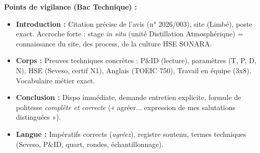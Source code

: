 \documentclass[11pt]{article}
\begin{document}
\begin{corrige}
\textbf{Points de vigilance (Bac Technique) :}
\begin{itemize}
    \item \textbf{Introduction :} Citation précise de l'avis (n° 2026/003), site (Limbé), poste exact. Accroche forte : stage \emph{in situ} (unité Distillation Atmosphérique) = connaissance du site, des process, de la culture HSE SONARA.
    \item \textbf{Corps :} Preuves techniques concrètes : P\&ID (lecture), paramètres (T, P, D, N), HSE (Seveso, certif N1), Anglais (TOEIC 750), Travail en équipe (3x8). Vocabulaire métier exact.
    \item \textbf{Conclusion :} Dispo immédiate, demande entretien explicite, formule de politesse \emph{complète et correcte} (« agréer... expression de mes salutations distinguées »).
    \item \textbf{Langue :} Impératifs corrects (\emph{agréez}), registre soutenu, termes techniques (Seveso, P\&ID, quart, rondes, échantillonnage).
\end{itemize}
\end{corrige}
\end{document}
